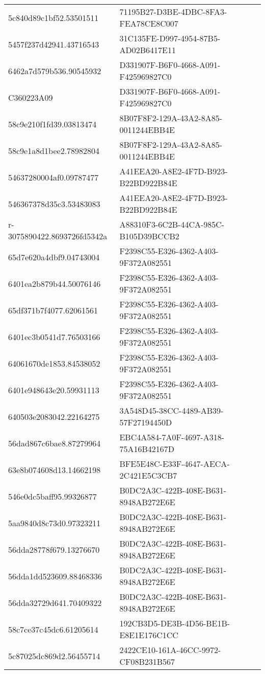 \begin{tabular}{ll}
5c840d89c1bf52.53501511 & 71195B27-D3BE-4DBC-8FA3-FEA78CE8C007 \\
5457f237d42941.43716543 & 31C135FE-D997-4954-87B5-AD02B6417E11 \\
6462a7d579b536.90545932 & D331907F-B6F0-4668-A091-F425969827C0 \\
C360223A09 & D331907F-B6F0-4668-A091-F425969827C0 \\
58c9e210f1fd39.03813474 & 8B07F8F2-129A-43A2-8A85-0011244EBB4E \\
58c9e1a8d1bee2.78982804 & 8B07F8F2-129A-43A2-8A85-0011244EBB4E \\
54637280004af0.09787477 & A41EEA20-A8E2-4F7D-B923-B22BD922B84E \\
546367378d35c3.53483083 & A41EEA20-A8E2-4F7D-B923-B22BD922B84E \\
r-3075890422.8693726fd5342a & A88310F3-6C2B-44CA-985C-B105D39BCCB2 \\
65d7e620a4dbf9.04743004 & F2398C55-E326-4362-A403-9F372A082551 \\
6401ea2b879b44.50076146 & F2398C55-E326-4362-A403-9F372A082551 \\
65df371b7f4077.62061561 & F2398C55-E326-4362-A403-9F372A082551 \\
6401ec3b0541d7.76503166 & F2398C55-E326-4362-A403-9F372A082551 \\
64061670de1853.84538052 & F2398C55-E326-4362-A403-9F372A082551 \\
6401e948643e20.59931113 & F2398C55-E326-4362-A403-9F372A082551 \\
640503e2083042.22164275 & 3A548D45-38CC-4489-AB39-57F27194450D \\
56dad867c6bae8.87279964 & EBC4A584-7A0F-4697-A318-75A16B42167D \\
63e8b074608d13.14662198 & BFE5E48C-E33F-4647-AECA-2C421E5C3CB7 \\
546e0dc5baff95.99326877 & B0DC2A3C-422B-408E-B631-8948AB272E6E \\
5aa9840d8c73d0.97323211 & B0DC2A3C-422B-408E-B631-8948AB272E6E \\
56dda28778f679.13276670 & B0DC2A3C-422B-408E-B631-8948AB272E6E \\
56dda1dd523609.88468336 & B0DC2A3C-422B-408E-B631-8948AB272E6E \\
56dda32729d641.70409322 & B0DC2A3C-422B-408E-B631-8948AB272E6E \\
58c7ce37c45dc6.61205614 & 192CB3D5-DE3B-4D56-BE1B-E8E1E176C1CC \\
5c87025dc869d2.56455714 & 2422CE10-161A-46CC-9972-CF08B231B567 \\

\end{tabular}
